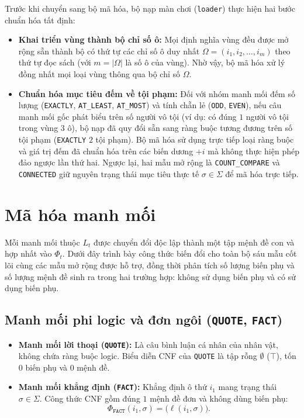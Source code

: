 Trước khi chuyển sang bộ mã hóa, bộ nạp màn chơi (\texttt{loader}) thực hiện hai bước chuẩn hóa tất định:
\begin{itemize}
    \item \textbf{Khai triển vùng thành bộ chỉ số ô:} Mọi định nghĩa vùng đều được mở rộng sẵn thành bộ có thứ tự các chỉ số ô duy nhất $\Omega = (i_1, i_2, \dots, i_m)$ theo thứ tự đọc sách (với $m = |\Omega|$ là số ô của vùng). Nhờ vậy, bộ mã hóa xử lý đồng nhất mọi loại vùng thông qua bộ chỉ số $\Omega$.
    \item \textbf{Chuẩn hóa mục tiêu đếm về tội phạm:} Đối với nhóm manh mối đếm số lượng (\texttt{EXACTLY}, \texttt{AT\_LEAST}, \texttt{AT\_MOST}) và tính chẵn lẻ (\texttt{ODD}, \texttt{EVEN}), nếu câu manh mối gốc phát biểu trên số người vô tội (ví dụ: có đúng $1$ người vô tội trong vùng $3$ ô), bộ nạp đã quy đổi sẵn sang ràng buộc tương đương trên số tội phạm (\texttt{EXACTLY} $2$ tội phạm). Bộ mã hóa sử dụng trực tiếp loại ràng buộc và giá trị đếm đã chuẩn hóa trên các biến dương $+i$ mà không thực hiện phép đảo ngược lần thứ hai. Ngược lại, hai mẫu mở rộng là \texttt{COUNT\_COMPARE} và \texttt{CONNECTED} giữ nguyên trạng thái mục tiêu thực tế $\sigma \in \Sigma$ để mã hóa trực tiếp.
\end{itemize}

\section{Mã hóa manh mối}
Mỗi manh mối thuộc $L_t$ được chuyển đổi độc lập thành một tập mệnh đề con và hợp nhất vào $\Phi_t$. Dưới đây trình bày công thức biến đổi cho toàn bộ sáu mẫu cốt lõi cùng các mẫu mở rộng được hỗ trợ, đồng thời phân tích số lượng biến phụ và số lượng mệnh đề sinh ra trong hai trường hợp: không sử dụng biến phụ và có sử dụng biến phụ.
\newpage
\subsection{Manh mối phi logic và đơn ngôi (\texttt{QUOTE}, \texttt{FACT})}
\begin{itemize}
    \item \textbf{Manh mối lời thoại (\texttt{QUOTE}):} Là câu bình luận cá nhân của nhân vật, không chứa ràng buộc logic. Biểu diễn CNF của \texttt{QUOTE} là tập rỗng $\emptyset$ ($\top$), tốn $0$ biến phụ và $0$ mệnh đề.

    \item \textbf{Manh mối khẳng định (\texttt{FACT}):} Khẳng định ô thứ $i_1$ mang trạng thái $\sigma \in \Sigma$. Công thức CNF gồm đúng $1$ mệnh đề đơn và không dùng biến phụ:
    \begin{equation}
        \Phi_{\texttt{FACT}}(i_1, \sigma) = \big(\ell(i_1, \sigma)\big).
    \end{equation}
\end{itemize}

